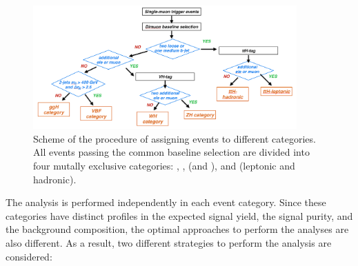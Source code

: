 \begin{figure}[!htb]
    \centering
    \captionsetup{justification=justified}
    \includegraphics[width=0.9\textwidth]{pics/category_scheme.png}
    \caption{Scheme of the procedure of assigning events to different categories. All events passing the common baseline selection
             are divided into four mutally exclusive categories: \ggH, \qqH, \VH (\WH and \ZH), and \ttH (leptonic and hadronic).}
    \label{fig:event_categories}
\end{figure}

The analysis is performed independently in each event category. 
Since these categories have distinct profiles in the expected signal yield, the signal purity, and the background composition, 
the optimal approaches to perform the analyses are also different.
As a result, two different strategies to perform the analysis are considered:

